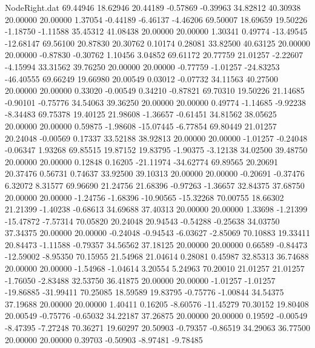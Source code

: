 \begin{filecontents}{NodeRight.dat}
  69.44946   18.62946   20.44189    -0.57869   -0.39963   34.82812   40.30938   20.00000   20.00000    1.37054   -0.44189   -6.46137   -4.46206
  69.50007   18.69659   19.50226    -1.18750   -1.11588   35.45312   41.08438   20.00000   20.00000    1.30341    0.49774  -13.49545  -12.68147
  69.56100   20.87830   20.30762     0.10174    0.28081   33.82500   40.63125   20.00000   20.00000   -0.87830   -0.30762    1.10456    3.04852
  69.61172   20.77759   21.01257    -2.22607   -4.15994   33.31562   39.76250   20.00000   20.00000   -0.77759   -1.01257  -24.83253  -46.40555
  69.66249   19.66980   20.00549     0.03012   -0.07732   34.11563   40.27500   20.00000   20.00000    0.33020   -0.00549    0.34210   -0.87821
  69.70310   19.50226   21.14685    -0.90101   -0.75776   34.54063   39.36250   20.00000   20.00000    0.49774   -1.14685   -9.92238   -8.34483
  69.75378   19.40125   21.98608    -1.36657   -0.61451   34.81562   38.05625   20.00000   20.00000    0.59875   -1.98608  -15.07445   -6.77854
  69.80449   21.01257   20.24048    -0.00569    0.17337   33.52188   38.92813   20.00000   20.00000   -1.01257   -0.24048   -0.06347    1.93268
  69.85515   19.87152   19.83795    -1.90375   -3.12138   34.02500   39.48750   20.00000   20.00000    0.12848    0.16205  -21.11974  -34.62774
  69.89565   20.20691   20.37476     0.56731    0.74637   33.92500   39.10313   20.00000   20.00000   -0.20691   -0.37476    6.32072    8.31577
  69.96690   21.24756   21.68396    -0.97263   -1.36657   32.84375   37.68750   20.00000   20.00000   -1.24756   -1.68396  -10.90565  -15.32268
  70.00755   18.66302   21.21399    -1.40238   -0.68613   34.69688   37.40313   20.00000   20.00000    1.33698   -1.21399  -15.47872   -7.57314
  70.05820   20.24048   20.94543    -0.54288   -0.25638   34.03750   37.34375   20.00000   20.00000   -0.24048   -0.94543   -6.03627   -2.85069
  70.10883   19.33411   20.84473    -1.11588   -0.79357   34.56562   37.18125   20.00000   20.00000    0.66589   -0.84473  -12.59002   -8.95350
  70.15955   21.54968   21.04614     0.28081    0.45987   32.85313   36.74688   20.00000   20.00000   -1.54968   -1.04614    3.20554    5.24963
  70.20010   21.01257   21.01257    -1.76050   -2.83488   32.53750   36.41875   20.00000   20.00000   -1.01257   -1.01257  -19.86885  -31.99411
  70.25085   18.59589   19.83795    -0.75776   -1.00844   34.54375   37.19688   20.00000   20.00000    1.40411    0.16205   -8.60576  -11.45279
  70.30152   19.80408   20.00549    -0.75776   -0.65032   34.22187   37.26875   20.00000   20.00000    0.19592   -0.00549   -8.47395   -7.27248
  70.36271   19.60297   20.50903    -0.79357   -0.86519   34.29063   36.77500   20.00000   20.00000    0.39703   -0.50903   -8.97481   -9.78485

\end{filecontents}
